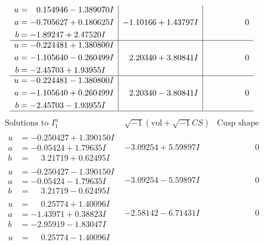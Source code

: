 \documentclass[1p]{elsarticle_modified}
\theoremstyle{definition}
\newcommand{\I}{\sqrt{-1}}
\begin{document}
$$\begin{array}{c|c|c}
\begin{aligned}
u &= \phantom{-}0.154946 - 1.389070 I \\
a &= -0.705627 + 0.180625 I \\
b &= -1.89247 + 2.47520 I\end{aligned}
 & -1.10166 + 1.43797 I & \phantom{-0.000000 } 0 \\ \hline\begin{aligned}
u &= -0.224481 + 1.380800 I \\
a &= -1.105640 - 0.260499 I \\
b &= -2.45703 + 1.93955 I\end{aligned}
 & \phantom{-}2.20340 + 3.80841 I & \phantom{-0.000000 } 0 \\ \hline\begin{aligned}
u &= -0.224481 - 1.380800 I \\
a &= -1.105640 + 0.260499 I \\
b &= -2.45703 - 1.93955 I\end{aligned}
 & \phantom{-}2.20340 - 3.80841 I & \phantom{-0.000000 } 0\\
 \hline 
 \end{array}$$\newpage$$\begin{array}{c|c|c}  
\text{Solutions to }I^u_{1}& \I (\text{vol} + \sqrt{-1}CS) & \text{Cusp shape}\\
 \hline 
\begin{aligned}
u &= -0.250427 + 1.390150 I \\
a &= -0.05424 + 1.79635 I \\
b &= \phantom{-}3.21719 + 0.62495 I\end{aligned}
 & -3.09254 + 5.59897 I & \phantom{-0.000000 } 0 \\ \hline\begin{aligned}
u &= -0.250427 - 1.390150 I \\
a &= -0.05424 - 1.79635 I \\
b &= \phantom{-}3.21719 - 0.62495 I\end{aligned}
 & -3.09254 - 5.59897 I & \phantom{-0.000000 } 0 \\ \hline\begin{aligned}
u &= \phantom{-}0.25774 + 1.40096 I \\
a &= -1.43971 + 0.38823 I \\
b &= -2.95919 - 1.83047 I\end{aligned}
 & -2.58142 - 6.71431 I & \phantom{-0.000000 } 0 \\ \hline\begin{aligned}
u &= \phantom{-}0.25774 - 1.40096 I \\

\end{aligned}
\end{array}$$
\end{document}
